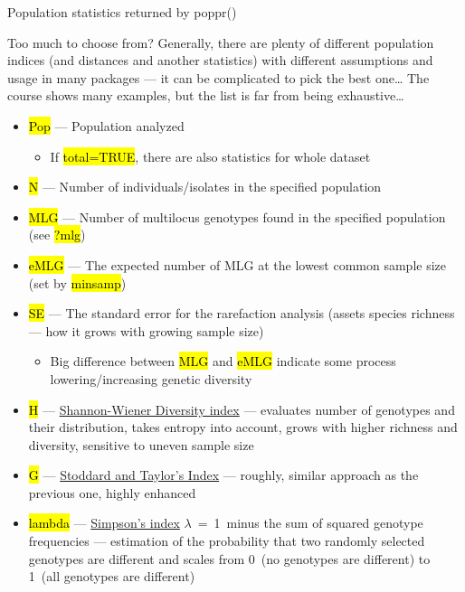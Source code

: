 \documentclass[compress, ucs, xelatex, 11pt, xcolor=svgnames,
  hyperref={
    bookmarks=true,
    unicode=true,
    colorlinks=true,
    pdftitle={Molecular data in R},
    plainpages=false,
    pdfauthor={Vojtech Zeisek},
    pdfsubject={Course about phylogeny and evolution in R},
    pdfcreator={XeLaTeX},
    pdfkeywords={R, evolution, phylogeny, molecular data},
    linkcolor=Tomato,
    anchorcolor=SaddleBrown,
    citecolor=Goldenrod,
    filecolor=DarkMagenta,
    menucolor=Sienna,
    urlcolor=DarkTurquoise,
    pdftex},
  url={hyphens, lowtilde} %
  ]{beamer}
\renewcommand{\texttt}[1]{\hl{\ttfamily #1}}
\begin{document}
\begin{frame}[allowframebreaks]{Population statistics returned by poppr()}
  \begin{block}{Too much to choose from?}
    Generally, there are plenty of different population indices (and distances and another statistics) with different assumptions and usage in many packages --- it can be complicated to pick the best one\ldots{ }The course shows many examples, but the list is far from being exhaustive\ldots
  \end{block}
  \begin{itemize}
    \item \texttt{Pop} --- Population analyzed
    \begin{itemize}
      \item If \texttt{total=TRUE}, there are also statistics for whole dataset
    \end{itemize}
    \item \texttt{N} --- Number of individuals/isolates in the specified population
    \item \texttt{MLG} --- Number of multilocus genotypes found in the specified population (see \texttt{?mlg})
    \item \texttt{eMLG} --- The expected number of MLG at the lowest common sample size (set by \texttt{minsamp})
    \item \texttt{SE} --- The standard error for the rarefaction analysis (assets species richness --- how it grows with growing sample size)
    \begin{itemize}
      \item Big difference between \texttt{MLG} and \texttt{eMLG} indicate some process lowering/increasing genetic diversity
    \end{itemize}
    \item \texttt{H} --- \href{https://en.wikipedia.org/wiki/Diversity_index\#Shannon_index}{Shannon-Wiener Diversity index} --- evaluates number of genotypes and their distribution, takes entropy into account, grows with higher richness and diversity, sensitive to uneven sample size
    \item \texttt{G} --- \href{http://www.genetics.org/content/118/4/705}{Stoddard and Taylor's Index} --- roughly, similar approach as the previous one, highly enhanced
    \item \texttt{lambda} --- \href{https://en.wikipedia.org/wiki/Diversity_index\#Simpson_index}{Simpson's index} $\lambda$~=~1~minus the sum of squared genotype frequencies --- estimation of the probability that two randomly selected genotypes are different and scales from 0~(no genotypes are different) to 1~(all genotypes are different)

\end{itemize}
\end{frame}
\end{document}
